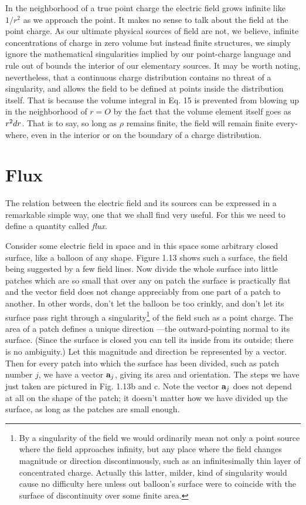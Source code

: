 In the neighborhood of a true point charge the electric field grows
infinite like $1/r^2$ as we approach the point. It makes no sense to talk
about the field at the point charge. As our ultimate physical sources
of field are not, we believe, infinite concentrations of charge in zero
volume but instead finite structures, we simply ignore the mathematical
singularities implied by our point-charge language and rule
out of bounds the interior of our elementary sources. It may be
worth noting, nevertheless, that a continuous charge distribution
contains no threat of a singularity, and allows the field to be defined
at points inside the distribution itself. That is because the volume
integral in Eq. 15 is prevented from blowing up in the neighborhood
of $r = O$ by the fact that the volume element itself goes as $r^2 d r$. That
is to say, so long as $\rho$ remains finite, the field will remain finite every-
where, even in the interior or on the boundary of a charge
distribution.


\section{Flux}

The relation between the electric field and its sources can be
expressed in a remarkable simple way, one that we shall find very
useful. For this we need to define a quantity called \emph{flux}.

Consider some electric field in space and in this space some
arbitrary closed surface, like a balloon of any shape. Figure 1.13
shows such a surface, the field being suggested by a few field lines.
Now divide the whole surface into little patches which are so small
that over any on patch the surface is practically flat and the vector
field does not change appreciably from one part of a patch to
another. In other words, don't let the balloon be too crinkly, and
don't let its surface pass right through a singularity\footnote{By a
singularity of the field we would ordinarily mean not only a point
source where the field approaches infinity, but any place where the
field changes magnitude or direction discontinuously, such as an
infinitesimally thin layer of concentrated charge.
Actually this latter, milder, kind of singularity would cause no
difficulty here unless out balloon's surface were to coincide with
the surface of discontinuity over some finite area.} of the field
such as a point charge. The area of a patch defines a unique
direction ---the outward-pointing normal to its surface. (Since the
surface is closed you can tell its inside from its outside; there is
no ambiguity.) Let this magnitude and direction be represented by a
vector. Then for every patch into which the surface has been divided,
such as patch number $j$, we have a vector $\mathbf{a}_j$, giving its area
and orientation. The steps we have just taken are pictured in Fig.
1.13b and c. Note the vector $\mathbf{a}_j$ does not depend at all on
the shape of the patch; it doesn't matter how we have divided up the
surface, as long as the patches are small enough.

